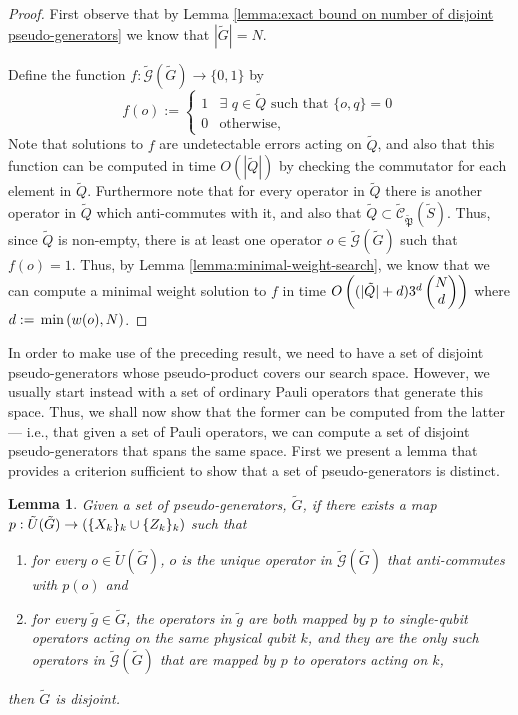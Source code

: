 \documentclass[twocolumn,showpacs,preprintnumbers,amsmath,amssymb,nofootinbib,pra,floatfix]{revtex4-1}
\newtheorem{lemma}{Lemma}
\newenvironment{remark}[1][Remark]{\begin{trivlist}
\item[\hskip \labelsep {\bfseries #1}]}{\end{trivlist}}
\newcommand{\set}{\tilde}
\newcommand{\genfun}{\tilde{\mathcal{G}}}
\newcommand{\pauligroup}{{\set{\mathfrak{P}}}}
\newcommand{\centralizer}{\set{\mathcal{C}}}
\begin{document}
\begin{proof}
First observe that by Lemma \ref{lemma:exact bound on number of disjoint pseudo-generators} we know that $|\set G|=N$.

Define the function $f:\genfun(\set G)\to\{0,1\}$ by
$$f(o):=
\begin{cases}
1 & \exists\,\, q\in\set Q \,\,\text{such that}\,\, \{o,q\}=0\\
0 & \text{otherwise},
\end{cases}
$$
Note that solutions to $f$ are undetectable errors acting on $\set Q$, and also that this function can be computed in time $O(|\set Q|)$ by checking the commutator for each element in $\set Q$.  Furthermore note that for every operator in $\set Q$ there is another operator in $\set Q$ which anti-commutes with it, and also that $\set Q\subset \centralizer_\pauligroup(\set S)$.  Thus, since $\set Q$ is non-empty, there is at least one operator $o\in\genfun(\set G)$ such that $f(o)=1$.  Thus, by Lemma \ref{lemma:minimal-weight-search}, we know that we can compute a minimal weight solution to $f$ in time $O\paren{(|\set Q|+d)3^d\choose{N}{d}}$ where $d:=\,\text{min}\left(w(o),N\right)$.
\end{proof}
\begin{remark}
In order to make use of the preceding result, we need to have a set of disjoint pseudo-generators whose pseudo-product covers our search space.  However, we usually start instead with a set of ordinary Pauli operators that generate this space.  Thus, we shall now show that the former can be computed from the latter --- i.e., that given a set of Pauli operators, we can compute a set of disjoint pseudo-generators that spans the same space.  First we present a lemma that provides a criterion sufficient to show that a set of pseudo-generators is distinct.
\end{remark}

\begin{lemma}
\label{lemma:disjointness-equvalence}
Given a set of pseudo-generators, $\set G$, if there exists a map $p:\set U(\set G)\to \paren{\{X_k\}_k \cup \{Z_k\}_k}$ such that
\begin{enumerate}
\item for every $o\in\set U(\set G)$, $o$ is the unique operator in $\genfun(\set G)$ that anti-commutes with $p(o)$ and
\item for every $\set g\in\set G$, the operators in $\set g$ are both mapped by $p$ to single-qubit operators acting on the same physical qubit $k$, and they are the only such operators in $\genfun(\set G)$ that are mapped by $p$ to operators acting on $k$,
\end{enumerate}
then $\set G$ is disjoint.
\end{lemma}
\end{document}
